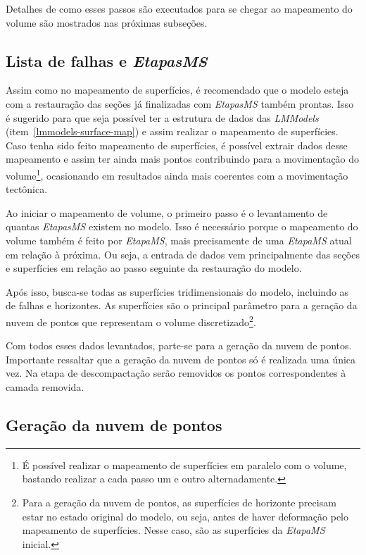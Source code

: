 Detalhes de como esses passos são executados para se chegar ao mapeamento do volume são mostrados nas próximas subseções.

\subsection{Lista de falhas e \emph{EtapasMS}}

Assim como no mapeamento de superfícies, é recomendado que o modelo esteja com a restauração das seções já finalizadas com \emph{EtapasMS} também prontas. Isso é sugerido para que seja possível ter a estrutura de dados das \emph{LMModels} (item~\ref{lmmodels-surface-map}) e assim realizar o mapeamento de superfícies. Caso tenha sido feito mapeamento de superfícies, é possível extrair dados desse mapeamento e assim ter ainda mais pontos contribuindo para a movimentação do volume\footnote{É possível realizar o mapeamento de superfícies em paralelo com o volume, bastando realizar a cada passo um e outro alternadamente.}, ocasionando em resultados ainda mais coerentes com a movimentação tectônica.

Ao iniciar o mapeamento de volume, o primeiro passo é o levantamento de quantas \emph{EtapasMS} existem no modelo. Isso é necessário porque o mapeamento do volume também é feito por \emph{EtapaMS}, mais precisamente de uma \emph{EtapaMS} atual em relação à próxima. Ou seja, a entrada de dados vem principalmente das seções e superfícies em relação ao passo seguinte da restauração do modelo.

Após isso, busca-se todas as superfícies tridimensionais do modelo, incluindo as de falhas e horizontes. As superfícies são o principal parâmetro para a geração da nuvem de pontos que representam o volume discretizado\footnote{Para a geração da nuvem de pontos, as superfícies de horizonte precisam estar no estado original do modelo, ou seja, antes de haver deformação pelo mapeamento de superfícies. Nesse caso, são as superfícies da \emph{EtapaMS} inicial.}.

Com todos esses dados levantados, parte-se para a geração da nuvem de pontos. Importante ressaltar que a geração da nuvem de pontos só é realizada uma única vez. Na etapa de descompactação serão removidos os pontos correspondentes à camada removida.

\subsection{Geração da nuvem de pontos}\label{cloud-points-generation}

